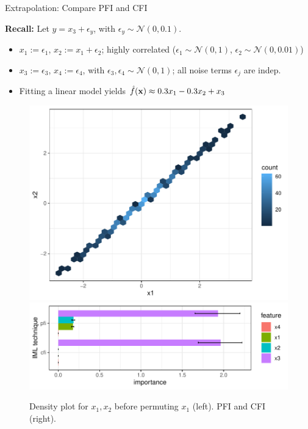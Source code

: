 \documentclass[10pt,compress,t,notes=noshow, xcolor=table]{beamer}
\begin{document}
\begin{frame}{Extrapolation: Compare PFI and CFI }

\textbf{Recall:} Let $y = x_3 + \epsilon_y$, with $\epsilon_y \sim \mathcal{N}(0, 0.1)$.

\begin{itemize}
  \item $x_1 := \epsilon_1$, $x_2 := x_1 + \epsilon_2$; highly correlated  
        ($\epsilon_1 \sim \mathcal{N}(0,1)$, $\epsilon_2 \sim \mathcal{N}(0, 0.01)$)
  \item $x_3 := \epsilon_3$, $x_4 := \epsilon_4$, with $\epsilon_3, \epsilon_4 \sim \mathcal{N}(0,1)$; all noise terms $\epsilon_j$ are indep.
  \item Fitting a linear model yields $\hat{f}(\mathbf{x}) \approx 0.3 x_1 - 0.3 x_2 + x_3$
\end{itemize} 
\begin{figure}
  \includegraphics[width=0.3\linewidth]{figure_man/pfi_hexbin_pre.pdf}\hfill
  \includegraphics[width=0.7\linewidth]{figure_man/cfi_pfi.pdf} %
  \caption{Density plot for $x_1, x_2$ before permuting $x_1$ (left). PFI and CFI (right).}
\end{figure}
% 

\end{frame}
\end{document}
